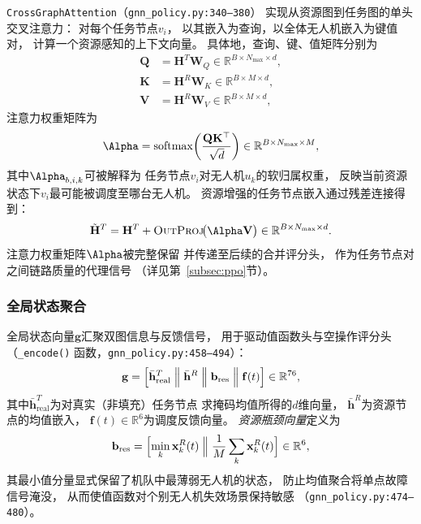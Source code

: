 \texttt{CrossGraphAttention}（\texttt{gnn\_policy.py:340--380}）
实现从资源图到任务图的单头交叉注意力：
对每个任务节点$v_i$，
以其嵌入为查询，以全体无人机嵌入为键值对，
计算一个资源感知的上下文向量。
具体地，查询、键、值矩阵分别为
\begin{align}
  \mathbf{Q} &= \mathbf{H}^T\mathbf{W}_Q
    \in \mathbb{R}^{B \times N_{\max} \times d},
  \label{eq:cross_Q}\\
  \mathbf{K} &= \mathbf{H}^R\mathbf{W}_K
    \in \mathbb{R}^{B \times M \times d},
  \label{eq:cross_K}\\
  \mathbf{V} &= \mathbf{H}^R\mathbf{W}_V
    \in \mathbb{R}^{B \times M \times d},
  \label{eq:cross_V}
\end{align}
注意力权重矩阵为
\begin{equation}
  \boldsymbol{\Alpha} =
    \mathrm{softmax}\!\left(
      \frac{\mathbf{Q}\mathbf{K}^\top}{\sqrt{d}}
    \right) \in \mathbb{R}^{B \times N_{\max} \times M},
  \label{eq:attn_weights}
\end{equation}
其中$\Alpha_{b,i,k}$可被解释为
任务节点$v_i$对无人机$u_k$的软归属权重，
反映当前资源状态下$v_i$最可能被调度至哪台无人机。
资源增强的任务节点嵌入通过残差连接得到：
\begin{equation}
  \tilde{\mathbf{H}}^T =
    \mathbf{H}^T +
    \textsc{OutProj}\!\bigl(\boldsymbol{\Alpha}\mathbf{V}\bigr)
    \in \mathbb{R}^{B \times N_{\max} \times d}.
  \label{eq:enriched}
\end{equation}
注意力权重矩阵$\boldsymbol{\Alpha}$被完整保留
并传递至后续的合并评分头，
作为任务节点对之间链路质量的代理信号
（详见第~\ref{subsec:ppo}节）。

\subsubsection*{全局状态聚合}

全局状态向量$\mathbf{g}$汇聚双图信息与反馈信号，
用于驱动值函数头与空操作评分头
（\texttt{\_encode()} 函数，\texttt{gnn\_policy.py:458--494}）：
\begin{equation}
  \mathbf{g} = \Bigl[
    \bar{\mathbf{h}}^T_{\text{real}}\;\Big\|\;
    \bar{\mathbf{h}}^R\;\Big\|\;
    \mathbf{b}_{\text{res}}\;\Big\|\;
    \mathbf{f}(t)
  \Bigr] \in \mathbb{R}^{76},
  \label{eq:global_state}
\end{equation}
其中$\bar{\mathbf{h}}^T_{\text{real}}$为对真实（非填充）任务节点
求掩码均值所得的$d$维向量，
$\bar{\mathbf{h}}^R$为资源节点的均值嵌入，
$\mathbf{f}(t) \in \mathbb{R}^6$为调度反馈向量。
\emph{资源瓶颈向量}定义为
\begin{equation}
  \mathbf{b}_{\text{res}} =
  \Bigl[
    \min_k \mathbf{x}_k^R(t)\;\Big\|\;
    \frac{1}{M}\sum_k \mathbf{x}_k^R(t)
  \Bigr] \in \mathbb{R}^6,
  \label{eq:res_bottleneck}
\end{equation}
其最小值分量显式保留了机队中最薄弱无人机的状态，
防止均值聚合将单点故障信号淹没，
从而使值函数对个别无人机失效场景保持敏感
（\texttt{gnn\_policy.py:474--480}）。

